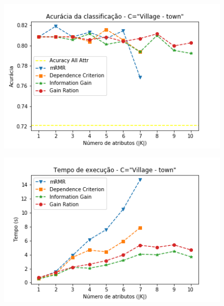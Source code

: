 \documentclass{beamer}
\begin{document}
\begin{frame}
	\begin{figure}[ht]
		\begin{center}
 	 	  \includegraphics[scale=0.7]{figuras/Acuracy_Village-town.png}	
		  \label{fig:fluxogramaAG}		
		\end{center}
	\end{figure}
\end{frame}



\begin{frame}
	\begin{figure}[ht]
		\begin{center}
 	 	  \includegraphics[scale=0.7]{figuras/Time_Village-town.png}	
		  \label{fig:fluxogramaAG}		
		\end{center}
	\end{figure}
\end{frame}
\end{document}
